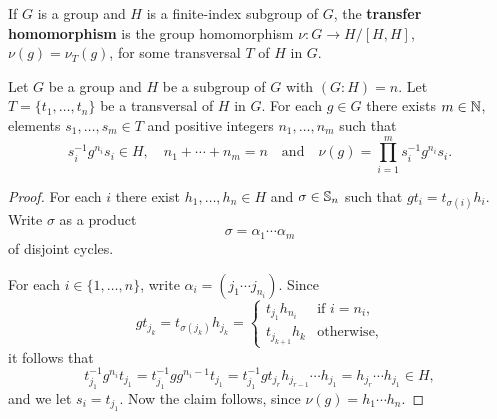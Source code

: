 If $G$ is a group and $H$ is a finite-index subgroup of $G$, the 
\textbf{transfer homomorphism} is the group homomorphism $\nu\colon G\to H/[H,H]$,
$\nu(g)=\nu_T(g)$, for some transversal $T$ of $H$ in $G$.
	
%
%
%


\begin{lemma}
	\label{lem:evaluation}
	Let $G$ be a group and $H$ be a subgroup of $G$ with $(G:H)=n$. Let 
	$T=\{t_1,\dots,t_n\}$ be a transversal of $H$ in $G$.  For each $g\in G$ there exists 
	$m\in\mathbb{N}$,  
	elements $s_{1},\dots,s_{m}\in T$ and positive integers $n_1,\dots,n_m$
	such that 
	\[
	s_i^{-1}g^{n_i}s_i\in H,
	\quad
	n_1+\cdots+n_m=n\quad\text{and}\quad   
	\nu(g)=\prod_{i=1}^m s_i^{-1}g^{n_i}s_i.
	\]
\end{lemma}


\begin{proof}
	For each $i$ there exist $h_1,\dots,h_n\in H$ and $\sigma\in\mathbb{S}_n$ such that 
	$gt_i=t_{\sigma(i)}h_i$. Write $\sigma$ as a product 
	\[
		\sigma=\alpha_1\cdots\alpha_m
	\]
	of disjoint cycles. 

	For each $i\in\{1,\dots,n\}$, write  
	$\alpha_i=(j_{1}\cdots j_{n_i})$. Since  
	\[
		g t_{j_k}=t_{\sigma(j_k)}h_{j_k}=\begin{cases}
			t_{j_1}h_{n_i} & \text{if $i=n_i$},\\
			t_{j_{k+1}}h_{k} & \text{otherwise},
		\end{cases}
	\]
	it follows that 
	\[
	t_{j_1}^{-1}g^{n_i}t_{j_1}
	=t_{j_1}^{-1}gg^{n_i-1}t_{j_1}
	=t_{j_1}^{-1}gt_{j_r}h_{j_{r-1}}\cdots h_{j_1}
	=h_{j_r}\cdots h_{j_1}\in H,
	\]
	and we let $s_i=t_{j_1}$. Now the claim follows, since $\nu(g)=h_1\cdots h_{n}$.
\end{proof}

